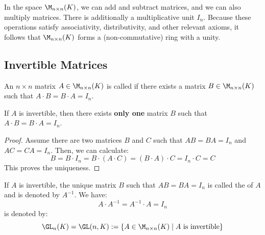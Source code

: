 \begin{remark}
In the space $\M_{n \times n}(K)$, we can add and subtract matrices, and we can also multiply matrices. There is additionally a multiplicative unit $I_n$. Because these operations satisfy associativity, distributivity, and other relevant axioms, it follows that $\M_{n \times n}(K)$ forms a (non-commutative) ring with a unity.
\end{remark}

\subsection{Invertible Matrices}

\begin{definition}[Invertibility]
An $n \times n$ matrix $A \in \M_{n \times n}(K)$ is called  if there exists a matrix $B \in \M_{n \times n}(K)$ such that $A \cdot B = B \cdot A = I_n$.
\end{definition}

\begin{remark}
If $A$ is invertible, then there exists \textbf{only one} matrix $B$ such that $A \cdot B = B \cdot A = I_n$.
\end{remark}

\begin{proof}
Assume there are two matrices $B$ and $C$ such that $AB = BA = I_n$ and $AC = CA = I_n$. Then, we can calculate:
\begin{equation*}
    B = B \cdot I_n = B \cdot (A \cdot C) = (B \cdot A) \cdot C = I_n \cdot C = C
\end{equation*}
This proves the uniqueness.
\end{proof}

\begin{definition}
If $A$ is invertible, the unique matrix $B$ such that $AB = BA = I_n$ is called the  of $A$ and is denoted by $A^{-1}$. We have:
\begin{equation*}
    A \cdot A^{-1} = A^{-1} \cdot A = I_n
\end{equation*}
 is denoted by:
\begin{equation*}
    \GL_n(K) = \GL(n, K) := \{A \in \M_{n \times n}(K) \mid A \text{ is invertible}\}
\end{equation*}
\end{definition}

